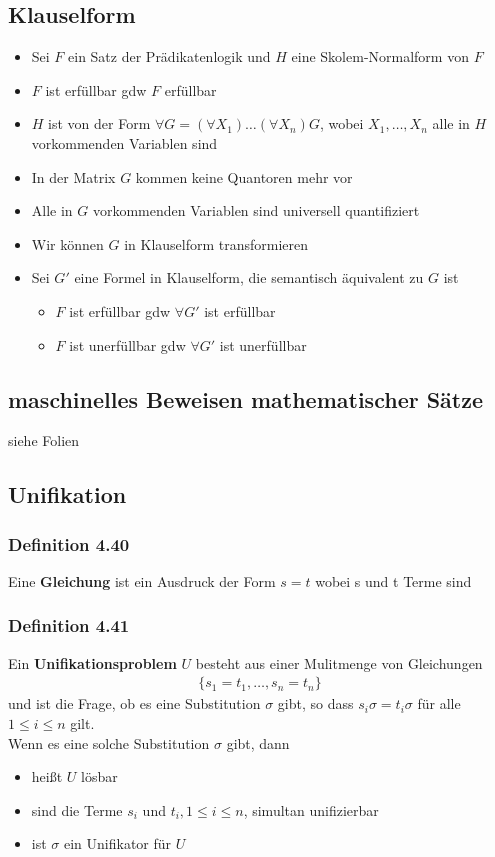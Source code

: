 \subsection{Klauselform}
\begin{itemize}
	\item Sei \(F\) ein Satz der Prädikatenlogik und \(H\) eine Skolem-Normalform von \(F\)
	\item \(F\) ist erfüllbar gdw \(F\) erfüllbar
	\item \(H\) ist von der Form \(\forall
	G = (\forall X_1) \ldots (\forall X_n) G\), wobei \(X_1, \ldots ,X_n\) alle in \(H\) vorkommenden Variablen sind
	\item In der Matrix \(G\) kommen keine Quantoren mehr vor
	\item Alle in \(G\) vorkommenden Variablen sind universell quantifiziert
	\item Wir können \(G\) in Klauselform transformieren
	\item Sei \(G'\) eine Formel in Klauselform, die semantisch äquivalent zu \(G\) ist
	\begin{itemize}
		\item \(F\) ist erfüllbar gdw \(\forall G'\) ist erfüllbar
		\item \(F\) ist unerfüllbar gdw \(\forall G'\) ist unerfüllbar
	\end{itemize}
\end{itemize}
\subsection{maschinelles Beweisen mathematischer Sätze}
siehe Folien
\subsection{Unifikation}
\subsubsection{Definition 4.40}
Eine \textbf{Gleichung} ist ein Ausdruck der Form \(s = t\) wobei s und t Terme sind
\subsubsection{Definition 4.41}
Ein \textbf{Unifikationsproblem} \(U\) besteht aus einer Mulitmenge von Gleichungen
\begin{align*}
\{ s_1 = t_1, \ldots , s_n = t_n \}
\end{align*}
und ist die Frage, ob es eine Substitution \(\sigma \) gibt, so dass \(s_i\sigma = t_i\sigma \) für alle \(1\le i \le n\) gilt. \\ Wenn es eine solche Substitution \(\sigma \) gibt, dann
\begin{itemize}
	\item heißt \(U\) lösbar
	\item sind die Terme \(s_i\) und \(t_i, 1 \le i \le n\), simultan unifizierbar
	\item ist \(\sigma\) ein Unifikator für \(U\)
\end{itemize}
